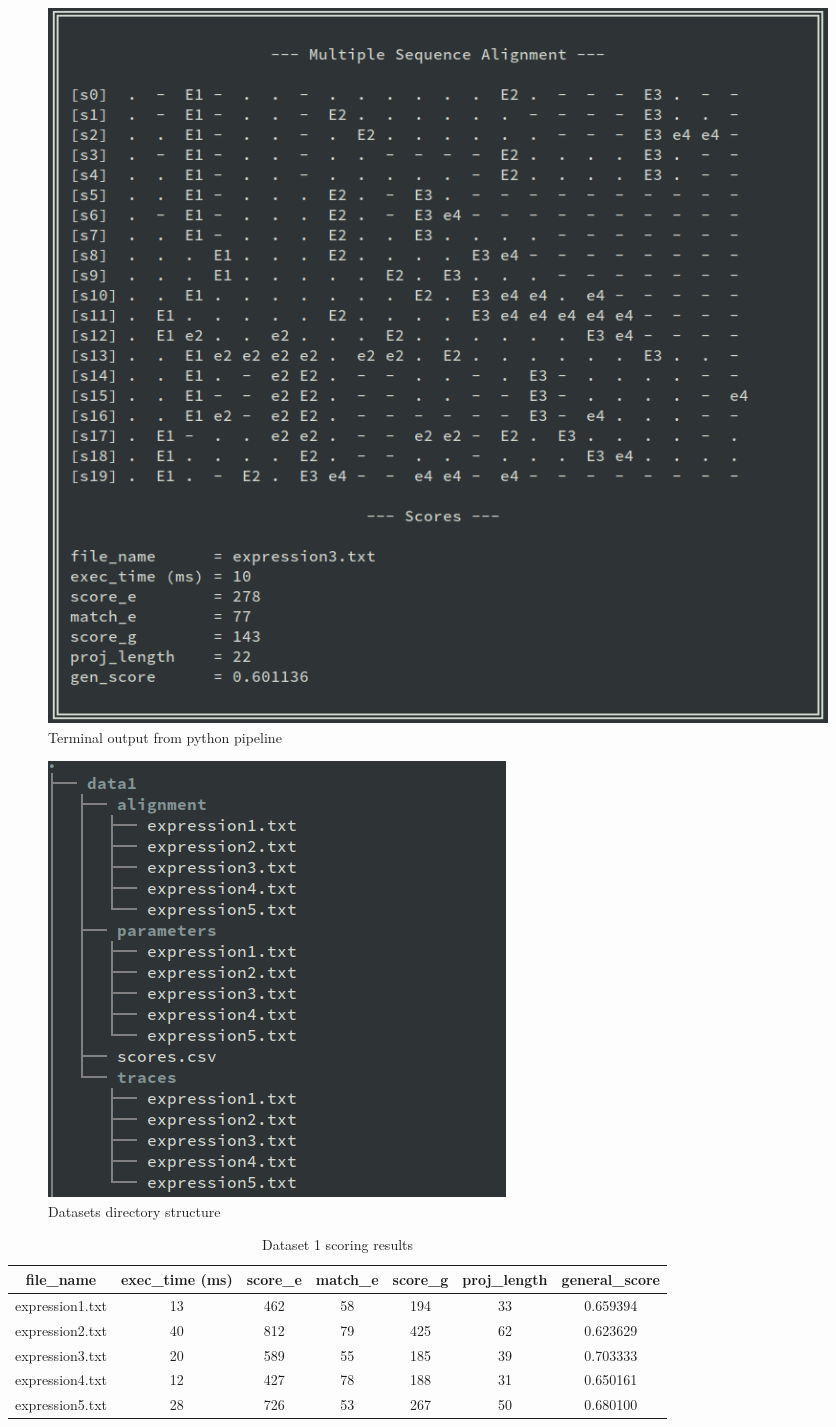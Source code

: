 \documentclass[12pt,a4paper]{article}
\begin{document}
\begin{figure}[H]
	\centering
	\includegraphics[width=0.75\linewidth]{img/terminal_output.png}
	\caption{Terminal output from python pipeline}
	\label{fig:output}
\end{figure}

\begin{figure}[H]
	\centering
	\includegraphics[width=0.45\linewidth]{img/terminal_tree.png}
	\caption{Datasets directory structure}
	\label{fig:tree}
\end{figure}


\pagebreak


\begin{table}[H]
	\begin{center}
		\caption{Dataset 1 scoring results}
		\begin{tabular}{|c|c|c|c|c|c|c|}
			\hline
			\textbf{file\_name} & \textbf{exec\_time} (ms) & \textbf{score\_e} & \textbf{match\_e} & \textbf{score\_g} & \textbf{proj\_length} & \textbf{general\_score} \\
			\hline\hline
			expression1.txt & 13 & 462 & 58 & 194 & 33 & 0.659394 \\
			\hline
			expression2.txt & 40 & 812 & 79 & 425 & 62 & 0.623629 \\
			\hline
			expression3.txt & 20 & 589 & 55 & 185 & 39 & 0.703333 \\
			\hline
			expression4.txt & 12 & 427 & 78 & 188 & 31 & 0.650161 \\
			\hline
			expression5.txt & 28 & 726 & 53 & 267 & 50 & 0.680100 \\
			\hline
		\end{tabular}
	\end{center}
\end{table}
\end{document}

